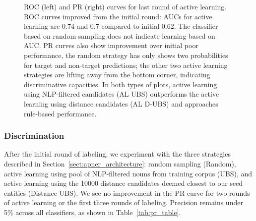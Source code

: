 \begin{figure}
\begin{minipage}[b]{.4\textwidth}
\captionsetup{labelformat=empty}
\label{fig:prcs_round5}
\end{minipage}
\caption{ROC (left) and PR (right) curves for last round of active learning. 
ROC curves improved from the initial round: AUCs for active learning are 0.74 and 0.7 compared to initial 0.62. 
The classifier based on random sampling does not indicate learning based on AUC. 
PR curves also show improvement over initial poor performance,
the random strategy has only shows two probabilities for target and non-target predictions; 
the other two active learning strategies are lifting away from the bottom corner, indicating discriminative capacities.
In both types of plots, active learning using NLP-filtered candidates (AL UBS) outperforms the active learning using distance candidates (AL D-UBS) and approaches rule-based performance.
}\label{fig:rocs_prcs_round5}
\end{figure}

\subsubsection{Discrimination}
After the initial round of labeling, we experiment with the three strategies described in Section~\ref{sect:apner_architecture}: random sampling (Random), active learning using pool of NLP-filtered nouns from training corpus (UBS), and active learning using the \num{10000} distance candidates deemed closest to our seed entities (Distance UBS). %
We see no improvement in the PR curve for two rounds of active learning or the first three rounds of labeling. 
Precision remains under 5\% across all classifiers, as shown in Table~\ref{tab:pr_table}. 

